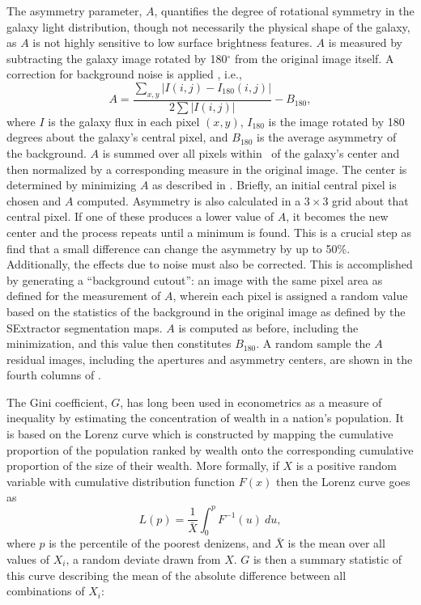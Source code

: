 The asymmetry parameter, $A$, quantifies the degree of rotational symmetry in the galaxy light distribution, though not necessarily the physical shape of the galaxy, as $A$ is not highly sensitive to low surface brightness features. $A$ is measured by subtracting the galaxy image rotated by 180$^{\circ}$ from the original image itself. A correction for background noise is applied \citep[as in e.g.,][]{Conselice2000, Lotz2004}, i.e., 
\begin{equation}\label{eqn: asymmetry}
A = \frac{\sum_{x,y} |I(i,j) - I_{180}(i,j)|}{ 2\sum|I(i,j)|} - B_{180},
\end{equation}
where $I$ is the galaxy flux in each pixel $(x, y)$, $I_{180}$ is the image rotated by 180 degrees about the galaxy's central pixel, and $B_{180}$ is the average asymmetry of the background. $A$ is summed over all pixels within \rp~of the galaxy's center and then normalized by a corresponding measure in the original image. The center is determined by minimizing $A$ as described in \cite{Conselice2000}. Briefly, an initial central pixel is chosen and $A$ computed. Asymmetry is also calculated in a $3\times3$ grid about that central pixel. If one of these produces a lower value of $A$, it becomes the new center and the process repeats until a minimum is found. This is a crucial step as \cite{Conselice2000} find that a small difference can change the asymmetry by up to 50\%. Additionally, the effects due to noise must also be corrected. This is accomplished by generating a ``background cutout'': an image with the same pixel area as defined for the measurement of $A$, wherein each pixel is assigned a random value based on the statistics of the background in the original image as defined by the SExtractor segmentation maps. $A$ is computed as before, including the minimization, and this value then constitutes $B_{180}$. A random sample the $A$ residual images, including the apertures and asymmetry centers, are shown in the fourth columns of . 

The Gini coefficient, $G$, has long been used in econometrics as a measure of inequality by estimating the concentration of wealth in a nation's population. It is based on the Lorenz curve \citep{Lorenz1905} which is constructed by mapping the cumulative proportion of the population ranked by wealth onto the corresponding cumulative proportion of the size of their wealth. More formally, if $X$ is a positive random variable with cumulative distribution function $F(x)$ then the Lorenz curve goes as   
\begin{equation}
L(p) = \frac{1}{\bar X}\int^p_0 F^{-1}(u)~du,
\end{equation}
where $p$ is the percentile of the poorest denizens, and $\bar X$ is the mean over all values of $X_i$, a random deviate drawn from $X$. $G$ is then a summary statistic of this curve describing the mean of the absolute difference between all combinations of $X_i$:

